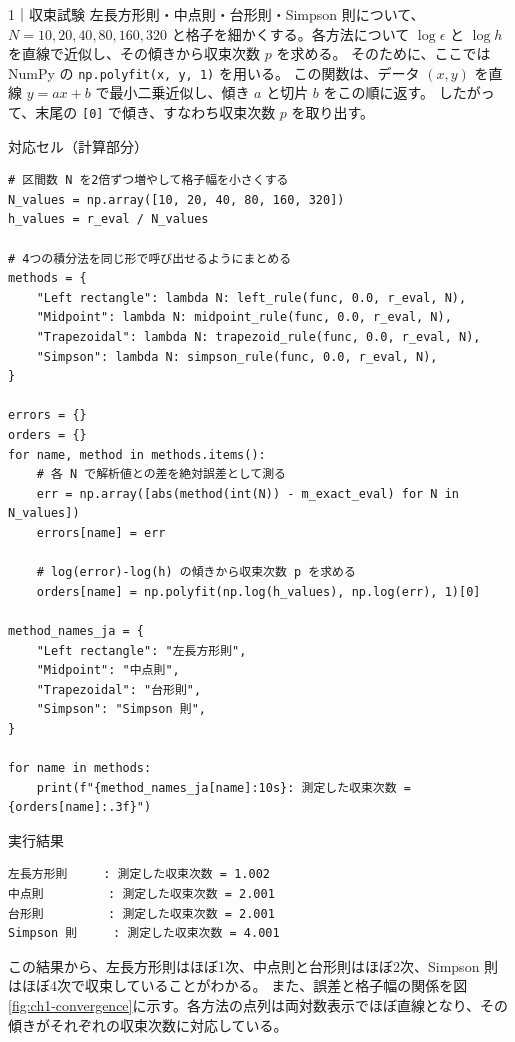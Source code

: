\begin{notebookblock}{1｜収束試験}
左長方形則・中点則・台形則・Simpson 則について、$N=10,20,40,80,160,320$ と格子を細かくする。各方法について $\log\epsilon$ と $\log h$ を直線で近似し、その傾きから収束次数 $p$ を求める。
そのために、ここでは NumPy の \texttt{np.polyfit(x, y, 1)} を用いる。
この関数は、データ $(x,y)$ を直線 $y=ax+b$ で最小二乗近似し、傾き $a$ と切片 $b$ をこの順に返す。
したがって、末尾の \texttt{[0]} で傾き、すなわち収束次数 $p$ を取り出す。

{\sffamily\small\color{graytext}対応セル（計算部分）}
\begin{Verbatim}[xleftmargin=2mm,fontsize=\small,frame=single,framesep=1.8mm,framerule=0.35pt,rulecolor=\color{listingframe},fillcolor=\color{listingbg}]
# 区間数 N を2倍ずつ増やして格子幅を小さくする
N_values = np.array([10, 20, 40, 80, 160, 320])
h_values = r_eval / N_values

# 4つの積分法を同じ形で呼び出せるようにまとめる
methods = {
    "Left rectangle": lambda N: left_rule(func, 0.0, r_eval, N),
    "Midpoint": lambda N: midpoint_rule(func, 0.0, r_eval, N),
    "Trapezoidal": lambda N: trapezoid_rule(func, 0.0, r_eval, N),
    "Simpson": lambda N: simpson_rule(func, 0.0, r_eval, N),
}

errors = {}
orders = {}
for name, method in methods.items():
    # 各 N で解析値との差を絶対誤差として測る
    err = np.array([abs(method(int(N)) - m_exact_eval) for N in N_values])
    errors[name] = err

    # log(error)-log(h) の傾きから収束次数 p を求める
    orders[name] = np.polyfit(np.log(h_values), np.log(err), 1)[0]

method_names_ja = {
    "Left rectangle": "左長方形則",
    "Midpoint": "中点則",
    "Trapezoidal": "台形則",
    "Simpson": "Simpson 則",
}

for name in methods:
    print(f"{method_names_ja[name]:10s}: 測定した収束次数 = {orders[name]:.3f}")
\end{Verbatim}

{\sffamily\small\color{graytext}実行結果}
\begin{Verbatim}[numbers=none,fontsize=\small]
左長方形則     : 測定した収束次数 = 1.002
中点則         : 測定した収束次数 = 2.001
台形則         : 測定した収束次数 = 2.001
Simpson 則     : 測定した収束次数 = 4.001
\end{Verbatim}
\end{notebookblock}

この結果から、左長方形則はほぼ1次、中点則と台形則はほぼ2次、Simpson 則はほぼ4次で収束していることがわかる。
また、誤差と格子幅の関係を図\ref{fig:ch1-convergence}に示す。各方法の点列は両対数表示でほぼ直線となり、その傾きがそれぞれの収束次数に対応している。

